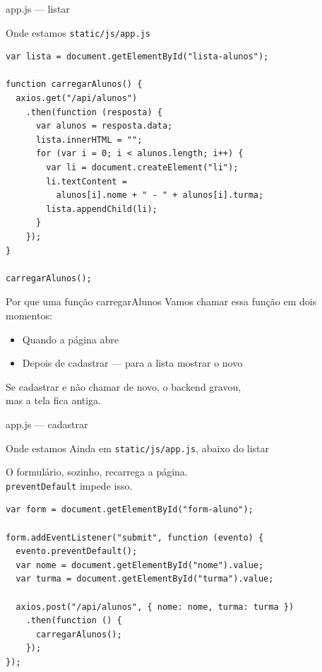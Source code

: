 \documentclass[aspectratio=169,11pt]{beamer}
\newcommand{\onde}[1]{%
  \begin{block}{Onde estamos}
    #1
  \end{block}
}
\begin{document}
\begin{frame}[fragile]{app.js --- listar}
  \onde{\texttt{static/js/app.js}}

\begin{lstlisting}[basicstyle=\ttfamily\footnotesize]
var lista = document.getElementById("lista-alunos");

function carregarAlunos() {
  axios.get("/api/alunos")
    .then(function (resposta) {
      var alunos = resposta.data;
      lista.innerHTML = "";
      for (var i = 0; i < alunos.length; i++) {
        var li = document.createElement("li");
        li.textContent =
          alunos[i].nome + " - " + alunos[i].turma;
        lista.appendChild(li);
      }
    });
}

carregarAlunos();
\end{lstlisting}
\end{frame}

\begin{frame}{Por que uma função carregarAlunos}
  Vamos chamar essa função em dois momentos:

  \vspace{0.5em}
  \begin{itemize}
    \item Quando a página abre
    \item Depois de cadastrar --- para a lista mostrar o novo
  \end{itemize}

  \vspace{0.6em}
  Se cadastrar e não chamar de novo, o backend gravou,\\
  mas a tela fica antiga.
\end{frame}

\begin{frame}[fragile]{app.js --- cadastrar}
  \onde{Ainda em \texttt{static/js/app.js}, abaixo do listar}

  O formulário, sozinho, recarrega a página.\\
  \texttt{preventDefault} impede isso.

\begin{lstlisting}[basicstyle=\ttfamily\footnotesize]
var form = document.getElementById("form-aluno");

form.addEventListener("submit", function (evento) {
  evento.preventDefault();
  var nome = document.getElementById("nome").value;
  var turma = document.getElementById("turma").value;

  axios.post("/api/alunos", { nome: nome, turma: turma })
    .then(function () {
      carregarAlunos();
    });
});
\end{lstlisting}
\end{frame}
\end{document}
